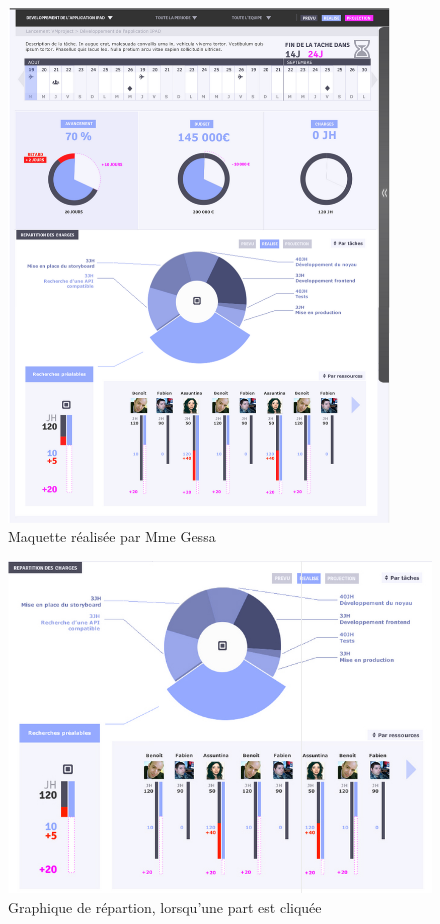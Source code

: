 \documentclass[12pt]{report}
\begin{document}
\begin{appendices}
	\begin{figure}[!h]
	\centering
	\includegraphics[width=0.9\textwidth]{pictures/maquetteeux.png}
	\caption{Maquette réalisée par Mme Gessa}
	\label{a4}
\end{figure}

\begin{figure}[H]
	\centering
	\includegraphics[width=1\textwidth]{pictures/maquetteVersusmind/repartitionClicked.jpg}
	\caption{Graphique de répartion, lorsqu'une part est cliquée}
	\label{15}
\end{figure}


\end{appendices}
\end{document}
